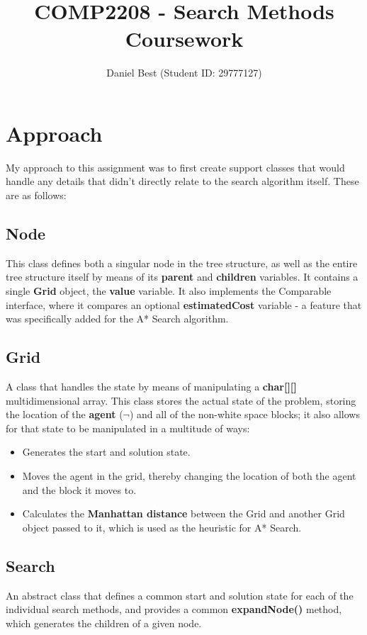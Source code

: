 \documentclass{article}
\title{COMP2208 - Search Methods Coursework}
\author{Daniel Best (Student ID: 29777127)}
\begin{document}
	\maketitle
	
	\newpage
	
	\section{Approach}
	My approach to this assignment was to first create support classes that would handle any details that didn't directly relate to the search algorithm itself. These are as follows:
	
	\subsection{Node}
	This class defines both a singular node in the tree structure, as well as the entire tree structure itself by means of its \textbf{parent} and \textbf{children} variables. It contains a single \textbf{Grid} object, the \textbf{value} variable. It also implements the Comparable interface, where it compares an optional \textbf{estimatedCost} variable - a feature that was specifically added for the A* Search algorithm.

	\subsection{Grid}
	A class that handles the state by means of manipulating a \textbf{char[][]} multidimensional array. This class stores the actual state of the problem, storing the location of the \textbf{agent} ($\neg$) and all of the non-white space blocks; it also allows for that state to be manipulated in a multitude of ways:
	
	\begin{itemize}
		\item Generates the start and solution state.
		\item Moves the agent in the grid, thereby changing the location of both the agent and the block it moves to.
		\item Calculates the \textbf{Manhattan distance} between the Grid and another Grid object passed to it, which is used as the heuristic for A* Search.
	\end{itemize}
	
	\subsection{Search}
	An abstract class that defines a common start and solution state for each of the individual search methods, and provides a common \textbf{expandNode()} method, which generates the children of a given node.
	
\end{document}
